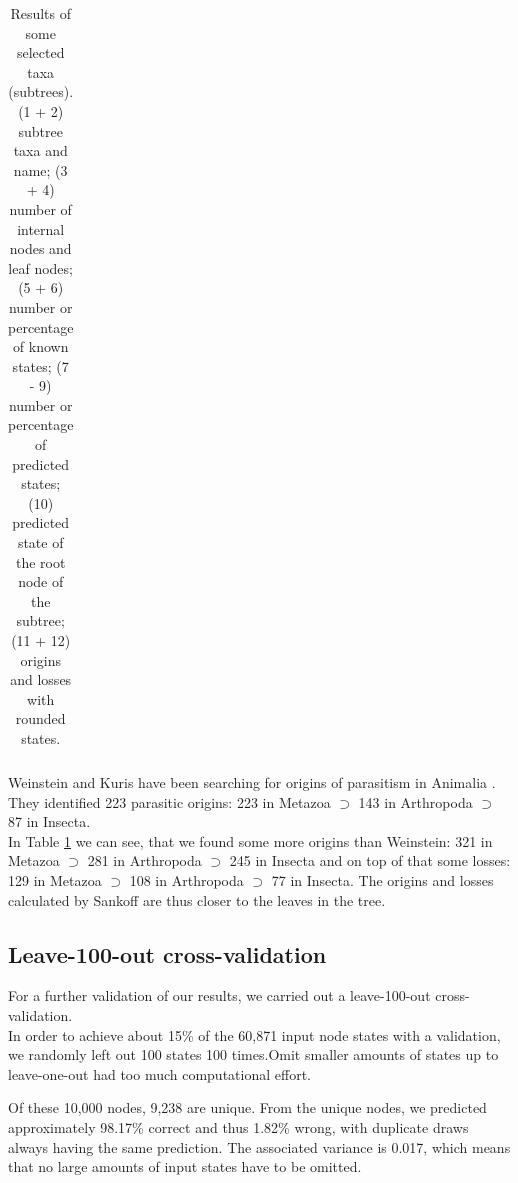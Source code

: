 \begin{table}
\begin{center}
\begin{tabular}{|>{\scriptsize}c|>{\scriptsize}l|>{\scriptsize}r|>{\scriptsize}r||>{\scriptsize}r|>{\scriptsize}r||>{\scriptsize}r|>{\scriptsize}r|>{\scriptsize}r||>{\scriptsize}r|>{\scriptsize}r|>{\scriptsize}r| }
            \hline
          \end{tabular} 
        \end{center}
        \caption{Results of some selected taxa (subtrees). \\
          (1 + 2) subtree taxa and name; 
          (3 + 4) number of internal nodes and leaf nodes; 
          (5 + 6) number or percentage of known states; 
          (7 - 9) number or percentage of predicted states; 
          (10) predicted state of the root node of the subtree; 
          (11 + 12) origins and losses with rounded states.}
          \label{table:results of some selected taxa}
      \end{table}

      Weinstein and Kuris have been searching for origins of parasitism in Animalia \cite{Weinstein2016}. 
        They identified 223 parasitic origins: 223 in Metazoa $\supset$ 143 in Arthropoda $\supset$ 87 
        in Insecta. \\
      In Table \ref{table:results of some selected taxa} we can see, that we found some more origins than 
        Weinstein: 321 in Metazoa $\supset$ 281 in Arthropoda $\supset$ 245 in Insecta and on top of 
        that some losses: 129 in Metazoa $\supset$ 108 in Arthropoda $\supset$ 77 in Insecta. The 
        origins and losses calculated by Sankoff are thus closer to the leaves in the tree.

    \subsection{Leave-100-out cross-validation} \label{sec:results - cross-validation}
      For a further validation of our results, we carried out a leave-100-out cross-validation. \\
      In order to achieve about 15\% of the 60,871 input node states with a validation, 
        we randomly left out 100 states 100 times.Omit smaller amounts of states up to leave-one-out had 
        too much computational effort.
        
      Of these 10,000 nodes, 9,238 are unique. From the unique nodes, we predicted approximately 
        98.17\% correct and thus 1.82\% wrong, with duplicate draws always having the same prediction. 
        The associated variance is 0.017, which means that no large amounts of input states have to be 
        omitted.
      
